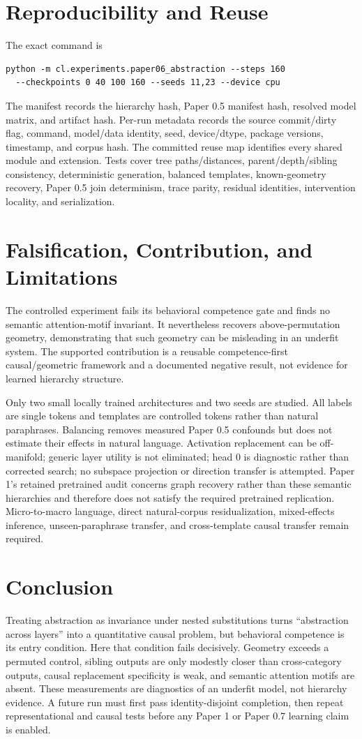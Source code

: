 \documentclass[11pt]{article}
\begin{document}
\section{Reproducibility and Reuse}
The exact command is
\begin{verbatim}
python -m cl.experiments.paper06_abstraction --steps 160
  --checkpoints 0 40 100 160 --seeds 11,23 --device cpu
\end{verbatim}
The manifest records the hierarchy hash, Paper 0.5 manifest hash, resolved model matrix, and artifact hash. Per-run metadata records the source commit/dirty flag, command, model/data identity, seed, device/dtype, package versions, timestamp, and corpus hash. The committed reuse map identifies every shared module and extension. Tests cover tree paths/distances, parent/depth/sibling consistency, deterministic generation, balanced templates, known-geometry recovery, Paper 0.5 join determinism, trace parity, residual identities, intervention locality, and serialization.

\section{Falsification, Contribution, and Limitations}
The controlled experiment fails its behavioral competence gate and finds no semantic attention-motif invariant. It nevertheless recovers above-permutation geometry, demonstrating that such geometry can be misleading in an underfit system. The supported contribution is a reusable competence-first causal/geometric framework and a documented negative result, not evidence for learned hierarchy structure.

Only two small locally trained architectures and two seeds are studied. All labels are single tokens and templates are controlled tokens rather than natural paraphrases. Balancing removes measured Paper 0.5 confounds but does not estimate their effects in natural language. Activation replacement can be off-manifold; generic layer utility is not eliminated; head 0 is diagnostic rather than corrected search; no subspace projection or direction transfer is attempted. Paper 1's retained pretrained audit concerns graph recovery rather than these semantic hierarchies and therefore does not satisfy the required pretrained replication. Micro-to-macro language, direct natural-corpus residualization, mixed-effects inference, unseen-paraphrase transfer, and cross-template causal transfer remain required.

\section{Conclusion}
Treating abstraction as invariance under nested substitutions turns ``abstraction across layers'' into a quantitative causal problem, but behavioral competence is its entry condition. Here that condition fails decisively. Geometry exceeds a permuted control, sibling outputs are only modestly closer than cross-category outputs, causal replacement specificity is weak, and semantic attention motifs are absent. These measurements are diagnostics of an underfit model, not hierarchy evidence. A future run must first pass identity-disjoint completion, then repeat representational and causal tests before any Paper 1 or Paper 0.7 learning claim is enabled.
\end{document}
